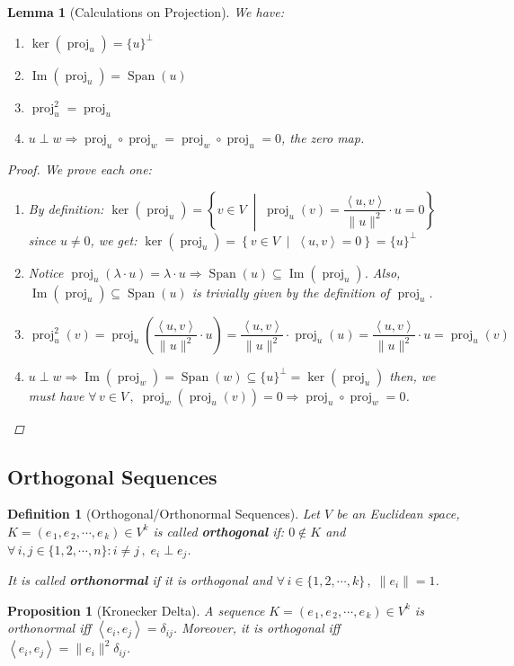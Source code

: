 \documentclass[12pt]{article}
\let\RA\Rightarrow
\newcommand{\set}[2]{\left\{{#1}\;\middle|\;{#2}\right\}}
\newcommand{\Forall}[1]{\forall\,{#1}\,,\;}
\newcommand{\seq}[2]{\left({#1}_{\,1},{#1}_{\,2},\cdots,{#1}_{\,#2}\right)}
\newcommand{\inner}[2]{\left\langle{#1},{#2}\right\rangle}
\DeclareMathOperator{\Image}{Im}
\DeclareMathOperator{\Span}{Span}
\DeclareMathOperator{\proj}{proj}
\newtheorem{definition}{Definition}[subsection]
\newtheorem{lemma}{Lemma}[subsection]
\newtheorem{proposition}{Proposition}[subsection]
\begin{document}
\begin{lemma}[Calculations on Projection]
  We have:
  \begin{enumerate}
    \item $\ker(\proj_u)=\{u\}^\perp$
    \item $\Image(\proj_u)=\Span(u)$
    \item $\proj_u^2=\proj_u$
    \item $u\perp w\RA \proj_u\circ\proj_w =\proj_w\circ \proj_u=0$, the zero map.
  \end{enumerate}
  \begin{proof}
    We prove each one:
    \begin{enumerate}
      \item By definition: $\ker(\proj_u)=\set{v\in V}{\proj_u(v)=\dfrac{\inner{u}{v}}{\|u\|^2}\cdot u=0}$ since $u\neq 0$, we get: $\ker(\proj_u)=\set{v\in V}{\inner{u}{v}=0}=\{u\}^\perp$
      \item Notice $\proj_u(\lambda\cdot u)=\lambda\cdot u\RA \Span(u)\subseteq\Image(\proj_u)$. Also, $\Image(\proj_u)\subseteq\Span(u)$ is trivially given by the definition of $\proj_u$.
      \item $\proj_u^2(v)=\proj_u\left(\dfrac{\inner{u}{v}}{\|u\|^2}\cdot u\right)=\dfrac{\inner{u}{v}}{\|u\|^2}\cdot \proj_u(u)=\dfrac{\inner{u}{v}}{\|u\|^2}\cdot u=\proj_u(v)$
      \item $u\perp w\RA \Image(\proj_w)=\Span(w)\subseteq\{u\}^\perp=\ker(\proj_u)$ then, we must have $\Forall{v\in V}\proj_w(\proj_u(v))=0\RA \proj_u\circ\proj_w =0$.
    \end{enumerate}
  \end{proof}
\end{lemma}

\subsection{Orthogonal Sequences}

\begin{definition}[Orthogonal/Orthonormal Sequences]
  Let $V$ be an Euclidean space, $K=\seq{e}{k}\in V^k$ is called \textbf{orthogonal} if: $0\notin K$ and $\Forall{i,j\in\{1,2,\cdots,n\}: i\neq j}e_i\perp e_j$.

  It is called \textbf{orthonormal} if it is orthogonal and $\Forall{i\in\{1,2,\cdots,k\}}\|e_i\|=1$.
\end{definition}

\begin{proposition}[Kronecker Delta]
  A sequence $K=\seq{e}{k}\in V^k$ is orthonormal iff $\inner{e_i}{e_j}=\delta_{ij}$. Moreover, it is orthogonal iff $\inner{e_i}{e_j}=\|e_i\|^2\delta_{ij}$.
\end{proposition}
\end{document}
